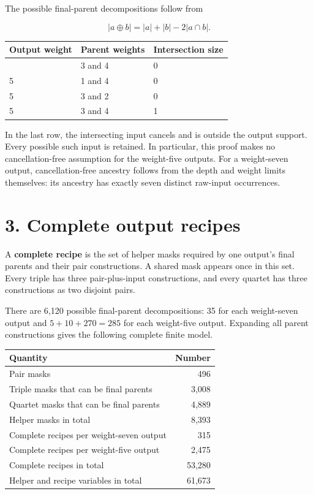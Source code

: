 The possible final-parent decompositions follow from

\[|a\oplus b|=|a|+|b|-2|a\cap b|.\]

\begin{longtable}[]{@{}lll@{}}
\toprule\noalign{}
Output weight & Parent weights & Intersection size \\
\midrule\noalign{}
\endhead
\bottomrule\noalign{}
\endlastfoot
7 & 3 and 4 & 0 \\
5 & 1 and 4 & 0 \\
5 & 3 and 2 & 0 \\
5 & 3 and 4 & 1 \\
\end{longtable}

In the last row, the intersecting input cancels and is outside the output support. Every possible such input is retained. In particular, this proof makes no cancellation-free assumption for the weight-five outputs. For a weight-seven output, cancellation-free ancestry follows from the depth and weight limits themselves: its ancestry has exactly seven distinct raw-input occurrences.

\hypertarget{complete-output-recipes}{%
\section{3. Complete output recipes}\label{complete-output-recipes}}

A \textbf{complete recipe} is the set of helper masks required by one output's final parents and their pair constructions. A shared mask appears once in this set. Every triple has three pair-plus-input constructions, and every quartet has three constructions as two disjoint pairs.

There are 6,120 possible final-parent decompositions: 35 for each weight-seven output and \(5+10+270=285\) for each weight-five output. Expanding all parent constructions gives the following complete finite model.

\begin{longtable}[]{@{}lr@{}}
\toprule\noalign{}
Quantity & Number \\
\midrule\noalign{}
\endhead
\bottomrule\noalign{}
\endlastfoot
Pair masks & 496 \\
Triple masks that can be final parents & 3,008 \\
Quartet masks that can be final parents & 4,889 \\
Helper masks in total & 8,393 \\
Complete recipes per weight-seven output & 315 \\
Complete recipes per weight-five output & 2,475 \\
Complete recipes in total & 53,280 \\
Helper and recipe variables in total & 61,673 \\
\end{longtable}

